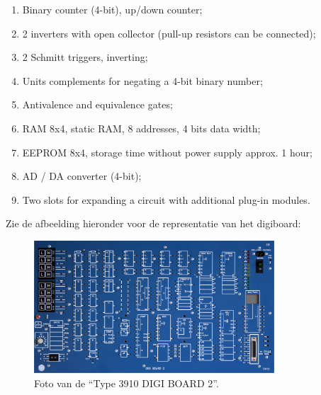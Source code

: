 \documentclass[12pt]{article}
\begin{document}
\begin{enumerate}
    \item Binary counter (4-bit), up/down counter;
    \item 2 inverters with open collector (pull-up resistors can be connected);
    \item 2 Schmitt triggers, inverting;
    \item Units complements for negating a 4-bit binary number;
    \item Antivalence and equivalence gates;
    \item RAM 8x4, static RAM, 8 addresses, 4 bits data width;
    \item EEPROM 8x4, storage time without power supply approx. 1 hour;
    \item AD / DA converter (4-bit);
    \item Two slots for expanding a circuit with additional plug-in modules.
\end{enumerate}
Zie de afbeelding hieronder voor de representatie van het digiboard:
\begin{figure}[h]
    \centering
    \includegraphics[width=0.8\textwidth]{3910.jpg}
    \caption{Foto van de ``Type 3910 DIGI BOARD 2''.}
    \label{fig:3910}
\end{figure}
\pagebreak
\end{document}
